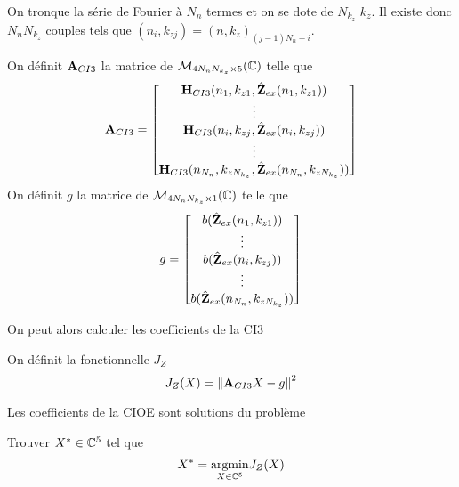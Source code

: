     On tronque la série de Fourier à \(N_{n}\) termes et on se dote de \(N_{k_z}\) \(k_z\). Il existe donc \(N_{n}N_{k_z}\) couples tels que \((n_i,k_{zj}) = (n,k_z)_{(j-1)N_{n}+i}\).
    \begin{defn}
      On définit \(\mathbf{A}_{CI3}\) la matrice de \(\mathcal{M}_{4N_{n}N_{k_z}\times5}(\mathbb C)\) telle que
      \begin{equation*}
        \mathbf{A}_{CI3} = 
        \begin{bmatrix}
          \mathbf{H}_{CI3}(n_1,k_{z1},\hat{\mathbf{Z}}_{ex}(n_1,k_{z1}))
          \\
          \vdots
          \\
          \mathbf{H}_{CI3}(n_i,k_{zj},\hat{\mathbf{Z}}_{ex}(n_i,k_{zj}))
          \\
          \vdots
          \\
          \mathbf{H}_{CI3}(n_{N_n},k_{zN_{k_z}},\hat{\mathbf{Z}}_{ex}(n_{N_n},k_{zN_{k_z}}))
        \end{bmatrix}
      \end{equation*}
      On définit \(g\) la matrice de \(\mathcal{M}_{4N_{n}N_{k_z}\times1}(\mathbb C)\) telle que
      \begin{equation*}
        g = 
        \begin{bmatrix}
          b(\hat{\mathbf{Z}}_{ex}(n_1,k_{z1}))
          \\
          \vdots
          \\
          b(\hat{\mathbf{Z}}_{ex}(n_i,k_{zj}))
          \\
          \vdots
          \\
          b(\hat{\mathbf{Z}}_{ex}(n_{N_n},k_{zN_{k_z}}))
        \end{bmatrix}
      \end{equation*}
    \end{defn}

    On peut alors calculer les coefficients de la CI3
    \begin{defn}
      On définit la fonctionnelle \(J_Z\)
      \begin{equation*}
        J_Z(X) = \left\lVert{\mathbf{A}}_{CI3}X - {g}\right\rVert^2
      \end{equation*}
    \end{defn}
    \begin{thm}

      Les coefficients de la CIOE sont solutions du problème

      Trouver \(X^* \in \mathbb C^5\) tel que
      \begin{equation*}
        X^* = {\underset{X\in \mathbb C^5}{\operatorname{argmin}}}  J_Z(X)
      \end{equation*}
    \end{thm}


